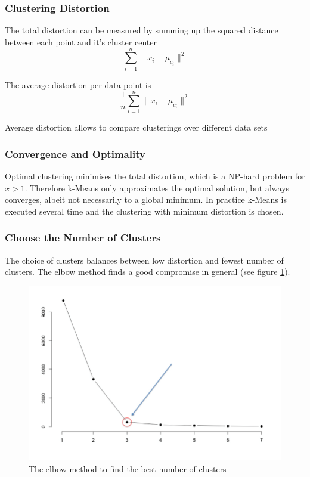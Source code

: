 \documentclass[11pt]{article}
\begin{document}
\subsubsection{Clustering Distortion}

The total distortion can be measured by summing up the squared distance between each point and it's cluster center
\begin{equation}
    \sum_{i=1}^{n}\| x_i -\mu_{c_i} \|^2
\end{equation}

The average distortion per data point is
\begin{equation}
    \frac{1}{n}\sum_{i=1}^{n}\| x_i -\mu_{c_i} \|^2
\end{equation}

Average distortion allows to compare clusterings over different data sets

\subsubsection{Convergence and Optimality}

Optimal clustering minimises the total distortion, which is a NP-hard problem for $x>1$. Therefore k-Means only approximates the optimal solution, but always converges, albeit not necessarily to a global minimum. In practice k-Means is executed several time and the clustering with minimum distortion is chosen.

\subsubsection{Choose the Number of Clusters}

The choice of clusters balances between low distortion and fewest number of clusters. The elbow method finds a good compromise in general (see figure \ref{fig:elbowmethod}).

\begin{figure}[htb!]
    \centering
    \includegraphics[keepaspectratio, width=0.4\linewidth]{Pictures/elbow_method}
    \caption{The elbow method to find the best number of clusters}
    \label{fig:elbowmethod}
\end{figure}
\end{document}
